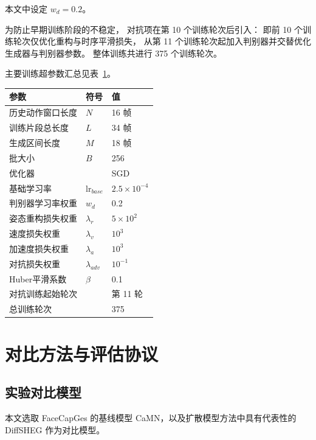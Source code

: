 本文中设定 $w_d = 0.2$。

为防止早期训练阶段的不稳定，
对抗项在第 10 个训练轮次后引入：
即前 10 个训练轮次仅优化重构与时序平滑损失，
从第 11 个训练轮次起加入判别器并交替优化生成器与判别器参数。
整体训练共进行 375 个训练轮次。

主要训练超参数汇总见表~\ref{tab:training_config}。

\begin{table}[h]
\centering
{}
\label{tab:training_config}
\begin{tabular}{lll}
\toprule
\textbf{参数} & \textbf{符号} & \textbf{值} \\
\midrule
历史动作窗口长度 & $N$ & 16 帧 \\
训练片段总长度   & $L$ & 34 帧 \\
生成区间长度     & $M$ & 18 帧 \\
批大小           & $B$ & 256 \\
优化器           &     & SGD \\
基础学习率       & $\mathrm{lr}_{base}$ & $2.5\times10^{-4}$ \\
判别器学习率权重 & $w_d$ & 0.2 \\
姿态重构损失权重    & $\lambda_r$ & $5\times10^{2}$ \\
速度损失权重    & $\lambda_v$ & $10^{3}$ \\
加速度损失权重    & $\lambda_a$ & $10^{3}$ \\
对抗损失权重    & $\lambda_{adv}$ & $10^{-1}$ \\
Huber平滑系数   & $\beta$ & 0.1 \\
对抗训练起始轮次 &     & 第 11 轮 \\
总训练轮次       &     & 375 \\
\bottomrule
\end{tabular}
\end{table}

\section{对比方法与评估协议}

\subsection{实验对比模型}

本文选取 FaceCapGes 的基线模型 CaMN\cite{beatcamn}，以及扩散模型方法中具有代表性的 DiffSHEG\cite{diffsheg} 作为对比模型。


